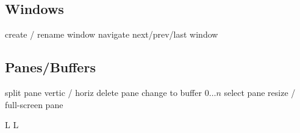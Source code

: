 \subsection{Windows}{}
	{create / rename window}
	{navigate next/prev/last window}

\subsection{Panes/Buffers}{}
	{split pane vertic / horiz}
	{delete pane}
	{change to buffer $0 \ldots n$}
	{select pane}
	{resize / full-screen pane}

\copyrightnotice

\supereject
\if L\lr \else\null\vfill\eject\fi
\if L\lr \else\null\vfill\eject\fi
\bye

